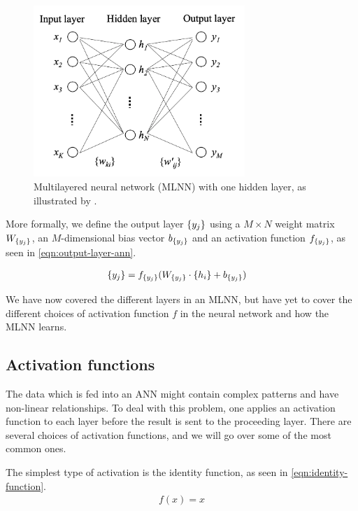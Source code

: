 \begin{figure}[H]
    \centering
    \includegraphics[width=8cm]{thesis/figures/multi-layer-neural-network-one-hidden-rong-2014.png}
    \caption{Multilayered neural network (MLNN) with one hidden layer, as illustrated by \cite[Figure 6]{rong2016word2vec}.}
    \label{fig:mlnn-one-hidden}
\end{figure}

More formally, we define the output layer $\left\{ {y}_{j} \right\}$ using a $M \times N$ weight matrix $W_{\left\{ {y}_{j} \right\}}$, an $M$-dimensional bias vector $b_{\left\{ {y}_{j} \right\}}$ and an activation function $f_{\left\{ {y}_{j} \right\}}$, as seen in \cref{eqn:output-layer-ann}.

\begin{align}
    \label{eqn:output-layer-ann}
    \left\{ {y}_{j} \right\} &= f_{\left\{ {y}_{j} \right\}}(W_{\left\{ {y}_{j} \right\}} \cdot \left\{ {h}_{i} \right\} + b_{\left\{ {y}_{j} \right\}})
\end{align}

We have now covered the different layers in an MLNN, but have yet to cover the different choices of activation function $f$ in the neural network and how the MLNN learns.

\subsection{Activation functions}
\label{sec:activation-functions-ann}
The data which is fed into an ANN might contain complex patterns and have non-linear relationships. To deal with this problem, one applies an activation function to each layer before the result is sent to the proceeding layer. There are several choices of activation functions, and we will go over some of the most common ones.

The simplest type of activation is the identity function, as seen in \cref{eqn:identity-function}.
\begin{align}
    \label{eqn:identity-function}
    f(x) = x
\end{align}


